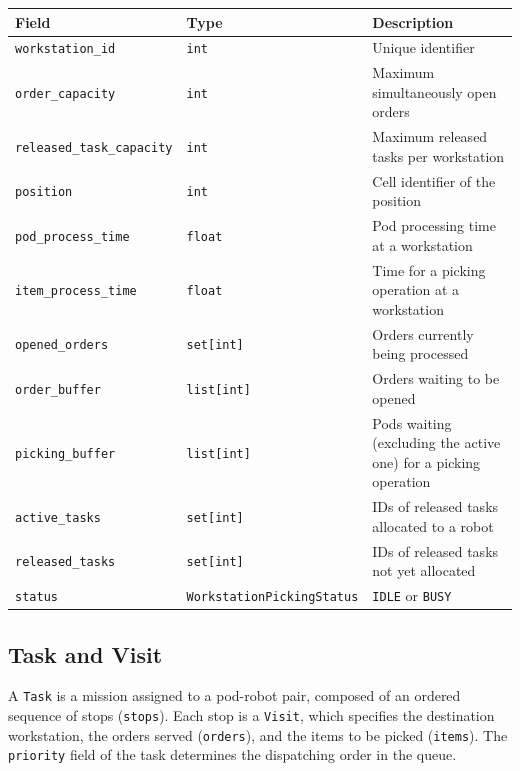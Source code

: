 \documentclass[a4paper,10pt]{article}
\begin{document}
\vspace{0.4em}
\begin{tabularx}{\textwidth}{l l X}
\toprule
\textbf{Field} & \textbf{Type} & \textbf{Description} \\
\midrule
\texttt{workstation\_id}         & \texttt{int}                            & Unique identifier \\
\texttt{order\_capacity}         & \texttt{int}                            & Maximum simultaneously open orders \\
\texttt{released\_task\_capacity}& \texttt{int}                      & Maximum released tasks per workstation \\
\texttt{position}                & \texttt{int}                      & Cell identifier of the position \\
\texttt{pod\_process\_time}      & \texttt{float}                          & Pod processing time at a workstation \\
\texttt{item\_process\_time}     & \texttt{float}                          & Time for a picking operation at a workstation \\
\texttt{opened\_orders}          & \texttt{set[int]}                       & Orders currently being processed \\
\texttt{order\_buffer}           & \texttt{list[int]}                      & Orders waiting to be opened \\
\texttt{picking\_buffer}         & \texttt{list[int]}                      & Pods waiting (excluding the active one) for a picking operation\\
\texttt{active\_tasks}           & \texttt{set[int]}                       & IDs of released tasks allocated to a robot \\
\texttt{released\_tasks}         & \texttt{set[int]}                       & IDs of released tasks not yet allocated \\
\texttt{status}                  & \texttt{WorkstationPickingStatus}       & \texttt{IDLE} or \texttt{BUSY} \\
\bottomrule
\end{tabularx}

\subsection{Task and Visit}

A \texttt{Task} is a mission assigned to a pod-robot pair, composed of an ordered sequence of stops (\texttt{stops}). Each stop is a \texttt{Visit}, which specifies the destination workstation, the orders served (\texttt{orders}), and the items to be picked (\texttt{items}). The \texttt{priority} field of the task determines the dispatching order in the queue.
\end{document}
